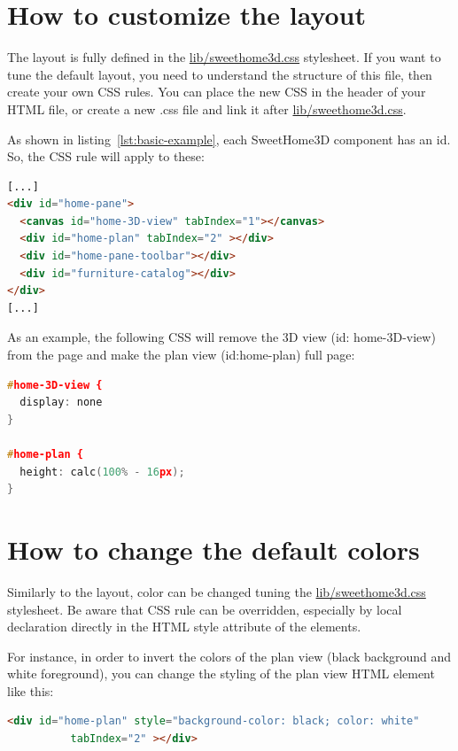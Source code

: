 \documentclass[a4paper]{report}
\begin{document}
\section{How to customize the layout}

The layout is fully defined in the \url{lib/sweethome3d.css} stylesheet. If you want to tune the default layout, you need to understand the structure of this file, then create your own CSS rules. You can place the new CSS in the header of your HTML file, or create a new .css file and link it after \url{lib/sweethome3d.css}.

As shown in listing~\ref{lst:basic-example}, each SweetHome3D component has an id. So, the CSS rule will apply to these:

\begin{lstlisting}[language=html]
[...]
<div id="home-pane">
  <canvas id="home-3D-view" tabIndex="1"></canvas>
  <div id="home-plan" tabIndex="2" ></div>
  <div id="home-pane-toolbar"></div>
  <div id="furniture-catalog"></div>
</div>
[...]
\end{lstlisting}

As an example, the following CSS will remove the 3D view (id: home-3D-view) from the page and make the plan view (id:home-plan)  full page:

\begin{lstlisting}[language=c]
#home-3D-view {
  display: none
}

#home-plan {
  height: calc(100% - 16px);
}
\end{lstlisting}

\section{How to change the default colors}

Similarly to the layout, color can be changed tuning the \url{lib/sweethome3d.css} stylesheet. Be aware that CSS rule can be overridden, especially by local declaration directly in the HTML style attribute of the elements. 

For instance, in order to invert the colors of the plan view (black background and white foreground), you can change the styling of the plan view HTML element like this:

\begin{lstlisting}[language=html]
  <div id="home-plan" style="background-color: black; color: white"         
          tabIndex="2" ></div>
\end{lstlisting}
\end{document}
